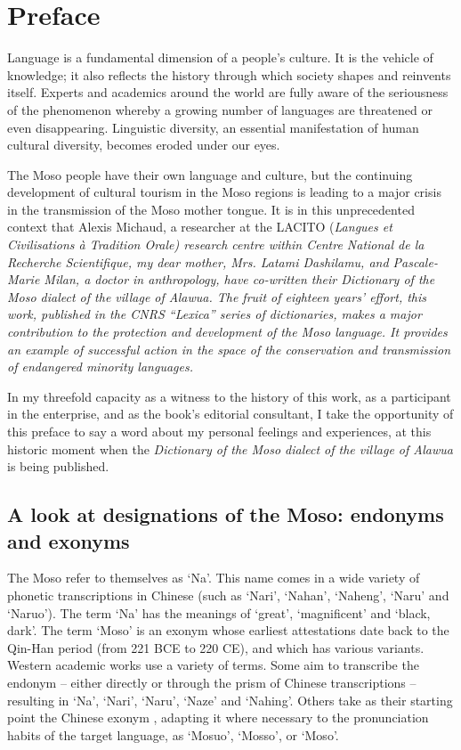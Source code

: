 \languefra

\chapter*{Preface}

Language is a fundamental dimension of a people's culture. It is the vehicle of knowledge; it also reflects the history through which society shapes and reinvents itself. Experts and academics around the world are fully aware of the seriousness of the phenomenon whereby a growing number of languages are threatened or even disappearing. Linguistic diversity, an essential manifestation of human cultural diversity, becomes eroded under our eyes.

The Moso people have their own language and culture, but the continuing development of cultural tourism in the Moso regions is leading to a major crisis in the transmission of the Moso mother tongue. It is in this unprecedented context that Alexis Michaud, a researcher at the LACITO (\em{Langues et Civilisations à Tradition Orale}) research centre within \emph{Centre National de la Recherche Scientifique}, my dear mother, Mrs. Latami Dashilamu, and Pascale-Marie Milan, a doctor in anthropology, have co-written their \emph{Dictionary of the Moso dialect of the village of Alawua}. The fruit of eighteen years' effort, this work, published in the CNRS “Lexica” series of dictionaries, makes a major contribution to the protection and development of the Moso language. It provides an example of successful action in the space of the conservation and transmission of endangered minority languages.

In my threefold capacity as a witness to the history of this work, as a participant in the enterprise, and as the book's editorial consultant, I take the opportunity of this preface to say a word about my personal feelings and experiences, at this historic moment when the \emph{Dictionary of the Moso dialect of the village of Alawua} is being published.

\section*{A look at designations of the Moso: endonyms and exonyms}

The Moso refer to themselves as ‘Na’. This name comes in a wide variety of phonetic transcriptions in Chinese (such as ‘Nari’, ‘Nahan’, ‘Naheng’, ‘Naru’ and ‘Naruo’). The term ‘Na’ has the meanings of ‘great’, ‘magnificent’ and ‘black, dark’. The term ‘Moso’ is an exonym whose earliest attestations date back to the Qin-Han period (from 221 BCE to 220 CE), and which has various variants. Western academic works use a variety of terms. Some aim to transcribe the endonym -- either directly or through the prism of Chinese transcriptions -- resulting in ‘Na’, ‘Nari’, ‘Naru’, ‘Naze’ and ‘Nahing’. Others take as their starting point the Chinese exonym , adapting it where necessary to the pronunciation habits of the target language, as ‘Mosuo’, ‘Mosso’, or ‘Moso’.

